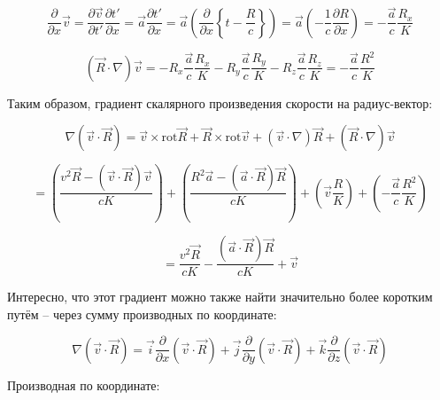 \documentclass[12pt, a4paper]{article}
\begin{document}
\begin{equation}
\frac{\partial}{\partial x} \vec{v} = \frac{\partial \vec{v}}{\partial t'} \frac{\partial t'}{\partial x} = \vec{a} \frac{\partial t'}{\partial x} = \vec{a} \left( \frac{\partial}{\partial x} \left\{ t - \frac{R}{c} \right\} \right) = \vec{a} \left( -\frac{1}{c} \frac{\partial R}{\partial x} \right) = -\frac{\vec{a}}{c} \frac{R_x}{K}
\label{eq:dv_dx}
\end{equation}

\begin{equation}
(\vec{R} \cdot \nabla) \vec{v} = -R_x \frac{\vec{a}}{c} \frac{R_x}{K} - R_y \frac{\vec{a}}{c} \frac{R_y}{K} - R_z \frac{\vec{a}}{c} \frac{R_z}{K} = -\frac{\vec{a}}{c} \frac{R^2}{K}
\label{eq:R_grad_v_final}
\end{equation}

Таким образом, градиент скалярного произведения скорости на радиус-вектор:

\begin{equation}
\nabla (\vec{v} \cdot \vec{R}) = \vec{v} \times \text{rot} \vec{R} + \vec{R} \times \text{rot} \vec{v} + (\vec{v} \cdot \nabla) \vec{R} + (\vec{R} \cdot \nabla) \vec{v}
\label{eq:grad_vR_full}
\end{equation}

\begin{equation}
= \left( \frac{v^2 \vec{R} - (\vec{v} \cdot \vec{R}) \vec{v}}{cK} \right) + \left( \frac{R^2 \vec{a} - (\vec{a} \cdot \vec{R}) \vec{R}}{cK} \right) + \left( \vec{v} \frac{R}{K} \right) + \left( -\frac{\vec{a}}{c} \frac{R^2}{K} \right)
\label{eq:grad_vR_expanded}
\end{equation}

\begin{equation}
= \frac{v^2 \vec{R}}{cK} - \frac{(\vec{a} \cdot \vec{R}) \vec{R}}{cK} + \vec{v}
\label{eq:grad_vR_final}
\end{equation}

Интересно, что этот градиент можно также найти значительно более коротким путём -- через сумму производных по координате:

\begin{equation}
\nabla (\vec{v} \cdot \vec{R}) = \vec{i} \frac{\partial}{\partial x} (\vec{v} \cdot \vec{R}) + \vec{j} \frac{\partial}{\partial y} (\vec{v} \cdot \vec{R}) + \vec{k} \frac{\partial}{\partial z} (\vec{v} \cdot \vec{R})
\label{eq:grad_vR_short}
\end{equation}

Производная по координате:
\end{document}
